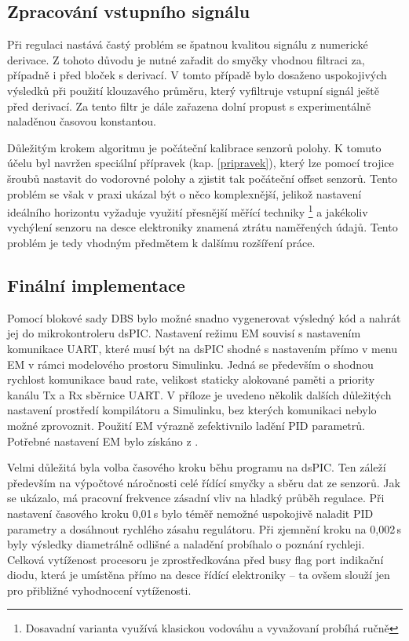 \subsection{Zpracování vstupního signálu}
\label{signal}

Při regulaci nastává častý problém se špatnou kvalitou signálu z numerické derivace. Z tohoto důvodu je nutné zařadit do smyčky vhodnou filtraci za, případně i před bloček s derivací. V tomto případě bylo dosaženo uspokojivých výsledků při použití klouzavého průměru, který vyfiltruje vstupní signál ještě před derivací. Za tento filtr je dále zařazena dolní propust s experimentálně naladěnou časovou konstantou.

Důležitým krokem algoritmu je počáteční kalibrace senzorů polohy. K tomuto účelu byl navržen speciální přípravek (kap. \ref{pripravek}), který lze pomocí trojice šroubů nastavit do vodorovné polohy a zjistit tak počáteční offset senzorů. Tento problém se však v praxi ukázal být o něco komplexnější, jelikož nastavení ideálního horizontu vyžaduje využití přesnější měřící techniky \footnote{Dosavadní varianta využívá klasickou vodováhu a vyvažovaní probíhá ručně} a jakékoliv vychýlení senzoru na desce elektroniky znamená ztrátu naměřených údajů. Tento problém je tedy vhodným předmětem k dalšímu rozšíření práce.

\subsection{Finální implementace}
\label{implement}

Pomocí blokové sady DBS bylo možné snadno vygenerovat výsledný kód a nahrát jej do mikrokontroleru dsPIC. Nastavení režimu EM souvisí s nastavením komunikace UART, které musí být na dsPIC shodné s nastavením přímo v menu EM v rámci modelového prostoru Simulinku. Jedná se především o shodnou rychlost komunikace baud rate, velikost staticky alokované paměti a priority kanálu Tx a Rx sběrnice UART. V příloze je uvedeno několik dalších důležitých nastavení prostředí kompilátoru a Simulinku, bez kterých komunikaci nebylo možné zprovoznit. Použití EM výrazně zefektivnilo ladění PID parametrů. Potřebné nastavení EM bylo získáno z \cite{kerhuel}.

Velmi důležitá byla volba časového kroku běhu programu na dsPIC. Ten záleží především na výpočtové náročnosti celé řídící smyčky a sběru dat ze senzorů. Jak se ukázalo, má pracovní frekvence zásadní vliv na hladký průběh regulace. Při nastavení časového kroku 0,01\,s bylo téměř nemožné uspokojivě naladit PID parametry a dosáhnout rychlého zásahu regulátoru. Při zjemnění kroku na 0,002\,s byly výsledky diametrálně odlišné a naladění probíhalo o poznání rychleji. Celková vytíženost procesoru je zprostředkována před busy flag port indikační diodu, která je umístěna přímo na desce řídící elektroniky -- ta ovšem slouží jen pro přibližné vyhodnocení vytíženosti.

